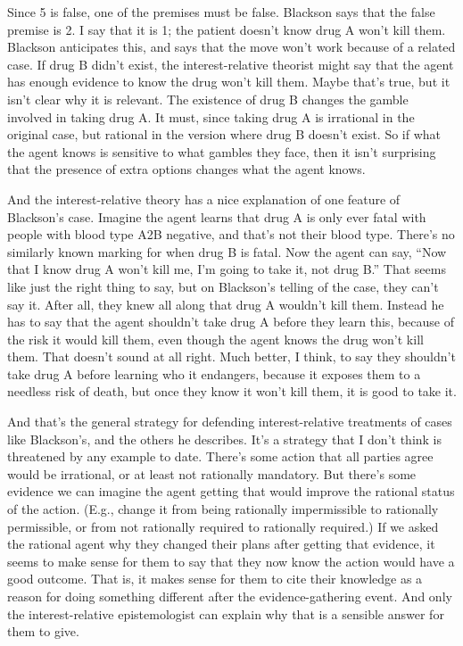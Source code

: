 \documentclass[
  10pt,
  letterpaper,
  DIV=11,
  numbers=noendperiod,
  twoside]{scrartcl}
\begin{document}
Since 5 is false, one of the premises must be false. Blackson says that
the false premise is 2. I say that it is 1; the patient doesn't know
drug A won't kill them. Blackson anticipates this, and says that the
move won't work because of a related case. If drug B didn't exist, the
interest-relative theorist might say that the agent has enough evidence
to know the drug won't kill them. Maybe that's true, but it isn't clear
why it is relevant. The existence of drug B changes the gamble involved
in taking drug A. It must, since taking drug A is irrational in the
original case, but rational in the version where drug B doesn't exist.
So if what the agent knows is sensitive to what gambles they face, then
it isn't surprising that the presence of extra options changes what the
agent knows.

And the interest-relative theory has a nice explanation of one feature
of Blackson's case. Imagine the agent learns that drug A is only ever
fatal with people with blood type A2B negative, and that's not their
blood type. There's no similarly known marking for when drug B is fatal.
Now the agent can say, ``Now that I know drug A won't kill me, I'm going
to take it, not drug B.'' That seems like just the right thing to say,
but on Blackson's telling of the case, they can't say it. After all,
they knew all along that drug A wouldn't kill them. Instead he has to
say that the agent shouldn't take drug A before they learn this, because
of the risk it would kill them, even though the agent knows the drug
won't kill them. That doesn't sound at all right. Much better, I think,
to say they shouldn't take drug A before learning who it endangers,
because it exposes them to a needless risk of death, but once they know
it won't kill them, it is good to take it.

And that's the general strategy for defending interest-relative
treatments of cases like Blackson's, and the others he describes. It's a
strategy that I don't think is threatened by any example to date.
There's some action that all parties agree would be irrational, or at
least not rationally mandatory. But there's some evidence we can imagine
the agent getting that would improve the rational status of the action.
(E.g., change it from being rationally impermissible to rationally
permissible, or from not rationally required to rationally required.) If
we asked the rational agent why they changed their plans after getting
that evidence, it seems to make sense for them to say that they now know
the action would have a good outcome. That is, it makes sense for them
to cite their knowledge as a reason for doing something different after
the evidence-gathering event. And only the interest-relative
epistemologist can explain why that is a sensible answer for them to
give.
\end{document}
